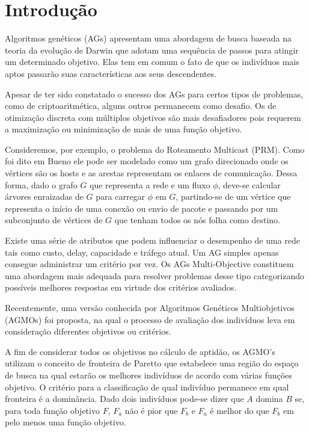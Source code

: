 \documentclass[12pt, %
openright, 
oneside, %
a4paper,    %
brazil]{facom-ufu-abntex2}
\begin{document}
\textual



\chapter*[Introdução]{Introdução}
	Algoritmos genéticos (AGs) apresentam uma abordagem de busca baseada na teoria da evolução de Darwin que adotam uma sequência de passos para atingir um determinado objetivo. Elas tem em comum o fato de que os indivíduos mais aptos passarão suas características aos seus descendentes.
	
	Apesar de ter sido constatado o sucesso dos AGs para certos tipos de problemas, como de criptoaritmética, alguns outros permanecem como desafio. Os de otimização discreta com múltiplos objetivos são mais desafiadores pois requerem a maximização ou minimização de mais de uma função objetivo.
		
	Consideremos, por exemplo, o problema do Roteamento Multicast (PRM). Como foi dito em Bueno \cite{bueno2010heuristicas} ele pode ser modelado como um grafo direcionado onde os vértices são os hosts e as arestas representam os enlaces de comunicação. Dessa forma, dado o grafo $G$ que representa a rede e um fluxo $\phi$, deve-se calcular árvores enraizadas de $G$ para carregar $\phi$ em $G$, partindo-se de um vértice que representa o início de uma conexão ou envio de pacote e passando por um subconjunto de vértices de $G$ que tenham todos os nós folha como destino.
	
	Existe uma série de atributos que podem influenciar o desempenho de uma rede tais como custo, delay, capacidade e tráfego atual. Um AG simples apenas consegue administrar um critério por vez. Os AGs Multi-Objective constituem uma abordagem mais adequada para resolver problemas desse tipo categorizando possíveis melhores respostas em virtude dos critérios avaliados.
	
	Recentemente, uma versão conhecida por Algoritmos Genéticos Multiobjetivos (AGMOs) foi proposta, na qual o processo de avaliação dos indivíduos leva em consideração diferentes objetivos ou critérios.
	
	A fim de considerar todos os objetivos no cálculo de aptidão, os AGMO's utilizam o conceito de fronteira de Paretto \cite{Pareto} que estabelece uma região do espaço de busca na qual estarão os melhores indivíduos de acordo com várias funções objetivo. O critério para a classificação de qual indivíduo permanece em qual fronteira é a dominância. Dado dois indivíduos pode-se dizer que $A$ domina $B$ se, para toda função objetivo $F$, $F_a$ não é pior que $F_b$ e $F_a$ é melhor do que $F_b$ em pelo menos uma função objetivo.
		
\end{document}
